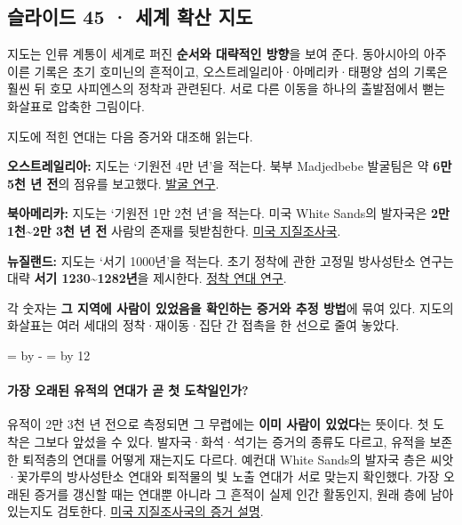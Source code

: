 \documentclass[10pt,a4paper]{article}
\newcommand{\ReserveQuestionSpace}{%
  \par\begingroup
  \dimen0=\pagegoal \advance\dimen0 by -\pagetotal
  \dimen2=\baselineskip \multiply\dimen2 by 12
  \ifdim\dimen0<\dimen2 \newpage\fi
  \endgroup}
\begin{document}
\subsection{슬라이드 45 · 세계 확산 지도}
지도는 인류 계통이 세계로 퍼진 \textbf{순서와 대략적인 방향}을 보여 준다. 동아시아의 아주 이른 기록은 초기 호미닌의 흔적이고, 오스트레일리아·아메리카·태평양 섬의 기록은 훨씬 뒤 호모 사피엔스의 정착과 관련된다. 서로 다른 이동을 하나의 출발점에서 뻗는 화살표로 압축한 그림이다.\par

지도에 적힌 연대는 다음 증거와 대조해 읽는다.\par

\noindent\textbullet \textbf{오스트레일리아:} 지도는 ‘기원전 4만 년’을 적는다. 북부 Madjedbebe 발굴팀은 약 \textbf{6만 5천 년 전}의 점유를 보고했다. \href{https://www.nature.com/articles/nature22968}{발굴 연구}.\par
\noindent\textbullet \textbf{북아메리카:} 지도는 ‘기원전 1만 2천 년’을 적는다. 미국 White Sands의 발자국은 \textbf{2만 1천\textasciitilde{}2만 3천 년 전} 사람의 존재를 뒷받침한다. \href{https://pubs.usgs.gov/publication/fs20253046/full}{미국 지질조사국}.\par
\noindent\textbullet \textbf{뉴질랜드:} 지도는 ‘서기 1000년’을 적는다. 초기 정착에 관한 고정밀 방사성탄소 연구는 대략 \textbf{서기 1230\textasciitilde{}1282년}을 제시한다. \href{https://pmc.ncbi.nlm.nih.gov/articles/PMC3033267/}{정착 연대 연구}.\par

각 숫자는 \textbf{그 지역에 사람이 있었음을 확인하는 증거와 추정 방법}에 묶여 있다. 지도의 화살표는 여러 세대의 정착·재이동·집단 간 접촉을 한 선으로 줄여 놓았다.\par

\ReserveQuestionSpace
\paragraph{가장 오래된 유적의 연대가 곧 첫 도착일인가?}
유적이 2만 3천 년 전으로 측정되면 그 무렵에는 \textbf{이미 사람이 있었다}는 뜻이다. 첫 도착은 그보다 앞섰을 수 있다. 발자국·화석·석기는 증거의 종류도 다르고, 유적을 보존한 퇴적층의 연대를 어떻게 재는지도 다르다. 예컨대 White Sands의 발자국 층은 씨앗·꽃가루의 방사성탄소 연대와 퇴적물의 빛 노출 연대가 서로 맞는지 확인했다. 가장 오래된 증거를 갱신할 때는 연대뿐 아니라 그 흔적이 실제 인간 활동인지, 원래 층에 남아 있는지도 검토한다. \href{https://pubs.usgs.gov/publication/fs20253046/full}{미국 지질조사국의 증거 설명}.\par
\end{document}
